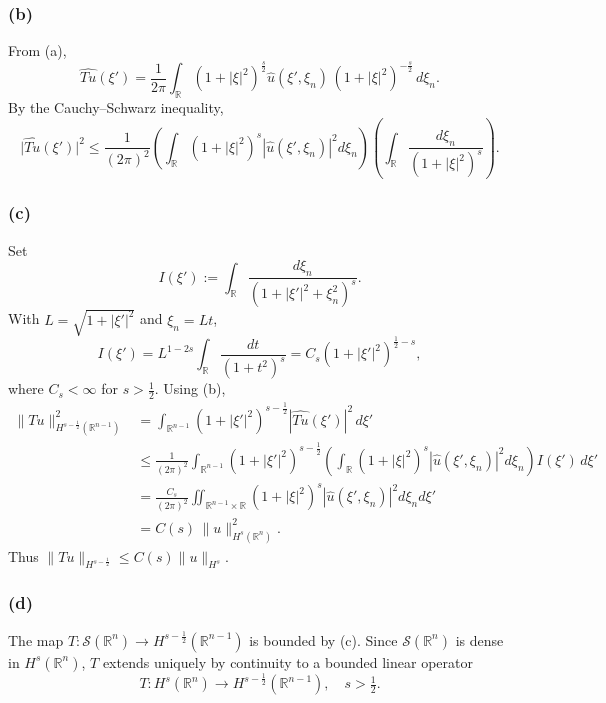 \documentclass[12pt,a4paper]{article}
\theoremstyle{plain}
\theoremstyle{definition}
\theoremstyle{remark}
\theoremstyle{remark}
\begin{document}
\subsubsection*{(b)}
From (a),
\[
\widehat{Tu}(\xi')
= \frac{1}{2\pi}\int_{\mathbb R}
(1+|\xi|^2)^{\frac{s}{2}}\widehat u(\xi',\xi_n)\,
(1+|\xi|^2)^{-\frac{s}{2}}\,d\xi_n.
\]
By the Cauchy--Schwarz inequality,
\[
\bigl|\widehat{Tu}(\xi')\bigr|^2
\le \frac{1}{(2\pi)^2}
\left(\int_{\mathbb R}(1+|\xi|^2)^s |\widehat u(\xi',\xi_n)|^2 d\xi_n\right)
\left(\int_{\mathbb R}\frac{d\xi_n}{(1+|\xi|^2)^s}\right).
\]

\subsubsection*{(c)}
Set
\[
I(\xi'):=\int_{\mathbb R}\frac{d\xi_n}{(1+|\xi'|^2+\xi_n^2)^s}.
\]
With $L=\sqrt{1+|\xi'|^2}$ and $\xi_n=Lt$,
\[
I(\xi')=L^{1-2s}\int_{\mathbb R}\frac{dt}{(1+t^2)^s}
= C_s(1+|\xi'|^2)^{\frac12-s},
\]
where $C_s<\infty$ for $s>\tfrac12$. Using (b),
\[
\begin{aligned}
	\|Tu\|_{H^{s-\frac12}(\mathbb R^{n-1})}^2
	&= \int_{\mathbb R^{n-1}}(1+|\xi'|^2)^{s-\frac12}|\widehat{Tu}(\xi')|^2\,d\xi'\\
	&\le \frac{1}{(2\pi)^2}\int_{\mathbb R^{n-1}}(1+|\xi'|^2)^{s-\frac12}
	\left(\int_{\mathbb R}(1+|\xi|^2)^s|\widehat u(\xi',\xi_n)|^2 d\xi_n\right) I(\xi')\,d\xi'\\
	&= \frac{C_s}{(2\pi)^2}\iint_{\mathbb R^{n-1}\times\mathbb R}(1+|\xi|^2)^s
	|\widehat u(\xi',\xi_n)|^2 d\xi_n d\xi' \\
	&= C(s)\,\|u\|_{H^s(\mathbb R^n)}^2.
\end{aligned}
\]
Thus $\|Tu\|_{H^{s-\frac12}}\le C(s)\|u\|_{H^s}$.

\subsubsection*{(d)}
The map $T:\mathcal S(\mathbb R^n)\to H^{s-\frac12}(\mathbb R^{n-1})$ is bounded by (c).
Since $\mathcal S(\mathbb R^n)$ is dense in $H^s(\mathbb R^n)$, $T$ extends uniquely by continuity to a bounded linear operator
\[
T:H^s(\mathbb R^n)\longrightarrow H^{s-\frac12}(\mathbb R^{n-1}),\quad s>\tfrac12.
\]
\end{document}
